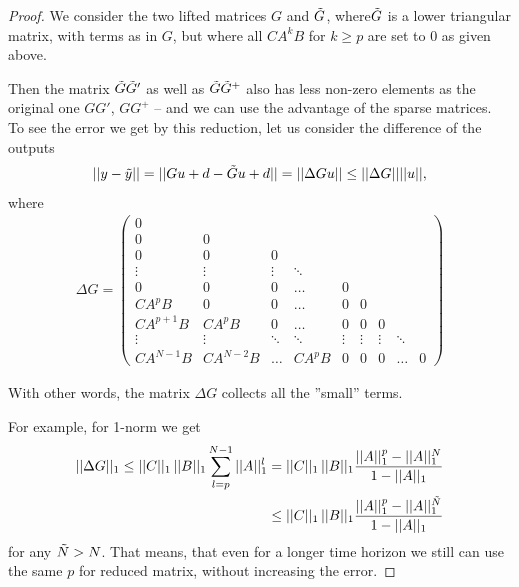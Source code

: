 \begin{proof}
	We consider the two lifted matrices $G$ and $\tilde{G}$, where$\tilde{G}$ is a lower triangular matrix, with terms as in $G$, but where all $C A^k B$ for $k\geq p$ are set to 0 as given above. 
	
	Then the matrix $\tilde{G} \tilde{G}'$ as well as $\tilde{G} \tilde{G}^+$ also has less non-zero elements as the original one $G G'$, $G G^+$ -- and we can use the advantage of the sparse matrices. 
	To see the error we get by this reduction, let us consider the difference of the outputs
	\begin{align}
	||y - \tilde{y}|| = ||G u + d - \tilde{G} u + d || = ||\Delta G u|| \leq ||\Delta G || ||u||, 
	\end{align}
	where 
	\begin{align}
	\Delta G = 
\begin{pmatrix}
	0  \\
	0 & 0 \\
	0 & 0 & 0\\
	\vdots & \vdots & \vdots & \ddots \\
	0 & 0 & 0 &\dots& 0 \\
	C A^{p} B           & 0 & 0& \dots & 0 & 0\\
	C A^{p+1} B & C A^{p} B & 0& \dots &0 & 0 & 0 \\
	\vdots & \vdots & \ddots & \ddots & \vdots & \vdots & \vdots & \ddots \\
	C A^{N-1} B & C A^{N-2} B & \dots & C A^p B& 0& 0 & 0 &\dots & 0
	\end{pmatrix}
	\end{align}
	
	With other words, the matrix $\Delta G$ collects all the ''small'' terms. 
	
	For example, for 1-norm we get 
\begin{align}
||\Delta G||_1  \leq ||C||_1\, ||B||_1 \sum_{l = p}^{N-1}||A||_1^l &= ||C||_1 \, ||B||_1 \frac{||A||_1^p - ||A||_1^N}{1 - ||A||_1} 
\\
&\leq ||C||_1 \, ||B||_1 \frac{||A||_1^p - ||A||_1^{\tilde{N}}}{1 - ||A||_1}
\end{align}	
for any $\tilde{N} > N$. That means, that even for a longer time horizon we still can use the same $p$ for reduced matrix, without increasing the error. 
\end{proof}
	
